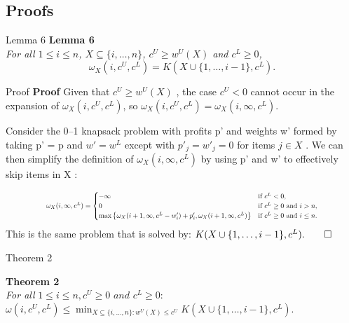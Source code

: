 \documentclass[fleqn,11pt,aspectratio=43]{beamer}
\begin{document}
    


\subsection{Proofs}


\begin{frame}{Lemma 6}
    \textbf{Lemma 6}\\
    \textit{For all $1 \leq i \leq n$, $X \subseteq \{i, \dots, n\}$, $c^U \geq w^U(X)$ and $c^L \geq 0$,}
\[
\omega_X(i, c^U, c^L) = K(X \cup \{1, \dots, i-1\}, c^L).
\]
\end{frame}



\begin{frame}{Proof}
\textbf{Proof} Given that  $c^U \geq w^U(X)$ , the case  $c^U < 0$  cannot occur in the expansion of  $\omega_X(i, c^U, c^L)$, so  $\omega_X(i, c^U, c^L) = \omega_X(i, \infty, c^L) . $

Consider the 0–1 knapsack problem with profits  p'  and weights  w'  formed by taking  p' = p  and  $w' = w^L$ except with  $p'_j = w'_j = 0$ for items  $j \in X$ . We can then simplify the definition of  $\omega_X(i, \infty, c^L)$ by using  p'  and  w'  to effectively skip items in  X :

\[
\scalebox{0.7}{$
\omega_X(i, \infty, c^L) =
\begin{cases} 
-\infty & \text{if } c^L < 0, \\
0 & \text{if } c^L \geq 0 \text{ and } i > n, \\
\max \left\{ \omega_X(i + 1, \infty, c^L - w'_i) + p'_i, \omega_X(i + 1, \infty, c^L) \right\} & \text{if } c^L \geq 0 \text{ and } i \leq n.
\end{cases}
$}
\]
This is the same problem that is solved by: $K(X \cup \{1, \ldots, i - 1\}, c^L) . \qed$
\end{frame}

\begin{frame}{Theorem 2}

\textbf{Theorem 2}\\
\textit{For all }  $1 \leq i \leq n ,  c^U \geq 0  \textit{ and }  c^L \geq 0: $\\$
\omega(i, c^U, c^L) \leq \min_{X \subseteq \{i, \ldots, n\} : w^U(X) \leq c^U} K(X \cup \{1, \ldots, i - 1\}, c^L).
$
\end{frame}
\end{document}
